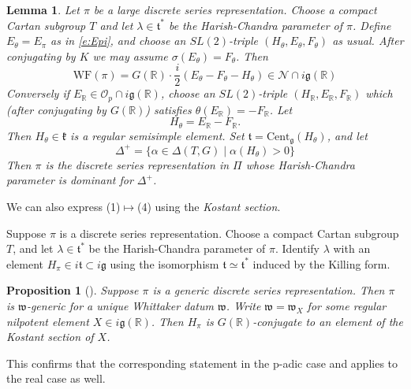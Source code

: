 \documentclass[10pt,leqno]{article}
\newtheorem{lemma}[equation]{Lemma}
\newtheorem{proposition}[equation]{Proposition}
\newcommand{\Cent}{\mathrm{Cent}}
\renewcommand{\O}{\mathcal O}
\newcommand{\R}{\mathbb R}
\newcommand{\N}{\mathcal N}
\renewcommand{\k}{\mathfrak k}
\renewcommand{\t}{\mathfrak t}
\newcommand{\g}{\mathfrak g}
\newcommand{\w}{\mathfrak w}
\newcommand{\WF}{\mathrm{WF}}
\newcommand{\Op}{\O_p}
\begin{document}
\begin{lemma}
  Let $\pi$ be a large discrete series representation.
Choose a compact Cartan subgroup $T$ and let $\lambda\in \t^*$ be the Harish-Chandra parameter of $\pi$.
Define $E_\theta=E_\pi$ as in \eqref{e:Epi}, and choose an $SL(2)$-triple $(H_\theta,E_\theta,F_\theta)$ as usual.
After conjugating by $K$ we may assume $\sigma(E_\theta)=F_\theta$.  Then
$$
\WF(\pi)=G(\R)\cdot\frac i2(E_\theta-F_\theta-H_\theta)\in\N\cap i\g(\R)
$$
Conversely if $E_\R\in \Op\cap i\g(\R)$, choose an $SL(2)$-triple $(H_\R,E_\R,F_\R)$ which (after conjugating by $G(\R)$) satisfies $\theta(E_\R)=-F_\R$.
Let
$$
H_\theta=E_\R-F_\R.
$$
Then $H_\theta\in\k$ is a regular semisimple element.
Set $\t=\Cent_{\g}(H_\theta)$, and let
$$
\Delta^+=\{\alpha\in\Delta(T,G)\mid  \alpha(H_\theta)>0\}
$$
Then $\pi$ is the discrete series representation in $\Pi$ whose Harish-Chandra parameter is dominant for $\Delta^+$. 
\end{lemma}

We can also express (1)$\mapsto$(4) using the {\it Kostant section}.

Suppose $\pi$ is a discrete series representation.
Choose a compact Cartan subgroup $T$, and let $\lambda\in\t^*$ be the Harish-Chandra parameter of $\pi$.
Identify $\lambda$ with an element $H_\pi\in i\t\subset i\g$ using the isomorphism $\t\simeq \t^*$ induced by the Killing form. 

\begin{proposition}[\cite{adams_kaletha}]
Suppose $\pi$ is a generic discrete series representation. Then $\pi$ is $\w$-generic
for a unique Whittaker datum $\w$.
Write $\w=\w_X$ for some regular nilpotent element $X\in i\g(\R)$.
Then $H_\pi$ is $G(\R)$-conjugate to an element of the Kostant section of $X$.
\end{proposition}


This confirms that  the corresponding statement  in the p-adic case \cite{debacker_reeder_generic} and \cite{kaletha_epipelagic}
applies to the real case as well.


\end{document}
